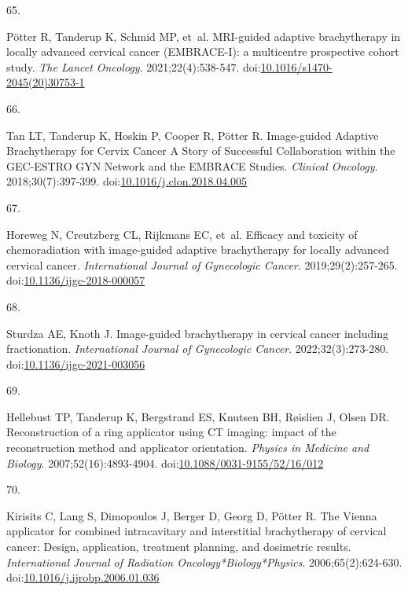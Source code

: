 \documentclass[
  a4paper,
]{scrreprt}
\newlength{\cslhangindent}
\newlength{\csllabelwidth}
\newlength{\cslentryspacingunit} %
\newenvironment{CSLReferences}[2] %
 {%
  \setlength{\parindent}{0pt}
  \ifodd #1
  \let\oldpar\par
  \def\par{\hangindent=\cslhangindent\oldpar}
  \fi
  \setlength{\parskip}{#2\cslentryspacingunit}
 }%
 {}
\newcommand{\CSLLeftMargin}[1]{\parbox[t]{\csllabelwidth}{#1}}
\newcommand{\CSLRightInline}[1]{\parbox[t]{\linewidth - \csllabelwidth}{#1}\break}
\begin{document}
\begin{CSLReferences}{0}{0}
\leavevmode{}%
\CSLLeftMargin{65. }%
\CSLRightInline{Pötter R, Tanderup K, Schmid MP, et~al. MRI-guided
adaptive brachytherapy in locally advanced cervical cancer (EMBRACE-I):
a multicentre prospective cohort study. \emph{The Lancet Oncology}.
2021;22(4):538-547.
doi:\href{https://doi.org/10.1016/s1470-2045(20)30753-1}{10.1016/s1470-2045(20)30753-1}}

\leavevmode{}%
\CSLLeftMargin{66. }%
\CSLRightInline{Tan LT, Tanderup K, Hoskin P, Cooper R, Pötter R.
Image-guided Adaptive Brachytherapy for Cervix Cancer {\textemdash} A
Story of Successful Collaboration within the GEC-ESTRO GYN Network and
the EMBRACE Studies. \emph{Clinical Oncology}. 2018;30(7):397-399.
doi:\href{https://doi.org/10.1016/j.clon.2018.04.005}{10.1016/j.clon.2018.04.005}}

\leavevmode{}%
\CSLLeftMargin{67. }%
\CSLRightInline{Horeweg N, Creutzberg CL, Rijkmans EC, et~al. Efficacy
and toxicity of chemoradiation with image-guided adaptive brachytherapy
for locally advanced cervical cancer. \emph{International Journal of
Gynecologic Cancer}. 2019;29(2):257-265.
doi:\href{https://doi.org/10.1136/ijgc-2018-000057}{10.1136/ijgc-2018-000057}}

\leavevmode{}%
\CSLLeftMargin{68. }%
\CSLRightInline{Sturdza AE, Knoth J. Image-guided brachytherapy in
cervical cancer including fractionation. \emph{International Journal of
Gynecologic Cancer}. 2022;32(3):273-280.
doi:\href{https://doi.org/10.1136/ijgc-2021-003056}{10.1136/ijgc-2021-003056}}

\leavevmode{}%
\CSLLeftMargin{69. }%
\CSLRightInline{Hellebust TP, Tanderup K, Bergstrand ES, Knutsen BH,
Røislien J, Olsen DR. Reconstruction of a ring applicator using CT
imaging: impact of the reconstruction method and applicator orientation.
\emph{Physics in Medicine and Biology}. 2007;52(16):4893-4904.
doi:\href{https://doi.org/10.1088/0031-9155/52/16/012}{10.1088/0031-9155/52/16/012}}

\leavevmode{}%
\CSLLeftMargin{70. }%
\CSLRightInline{Kirisits C, Lang S, Dimopoulos J, Berger D, Georg D,
Pötter R. The Vienna applicator for combined intracavitary and
interstitial brachytherapy of cervical cancer: Design, application,
treatment planning, and dosimetric results. \emph{International Journal
of Radiation Oncology*Biology*Physics}. 2006;65(2):624-630.
doi:\href{https://doi.org/10.1016/j.ijrobp.2006.01.036}{10.1016/j.ijrobp.2006.01.036}}


\end{CSLReferences}
\end{document}
